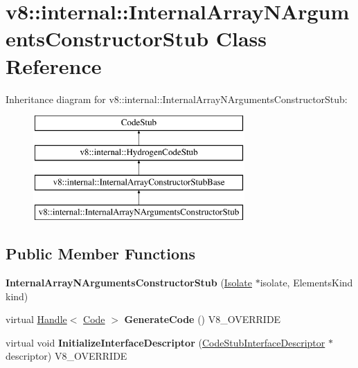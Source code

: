\hypertarget{classv8_1_1internal_1_1_internal_array_n_arguments_constructor_stub}{}\section{v8\+:\+:internal\+:\+:Internal\+Array\+N\+Arguments\+Constructor\+Stub Class Reference}
\label{classv8_1_1internal_1_1_internal_array_n_arguments_constructor_stub}
Inheritance diagram for v8\+:\+:internal\+:\+:Internal\+Array\+N\+Arguments\+Constructor\+Stub\+:\begin{figure}[H]
\begin{center}
\leavevmode
\includegraphics[height=4.000000cm]{classv8_1_1internal_1_1_internal_array_n_arguments_constructor_stub}
\end{center}
\end{figure}
\subsection*{Public Member Functions}
\begin{DoxyCompactItemize}
\item 
\hypertarget{classv8_1_1internal_1_1_internal_array_n_arguments_constructor_stub_af94b73d095ffded5b0cff059e72cbd9a}{}{\bfseries Internal\+Array\+N\+Arguments\+Constructor\+Stub} (\hyperlink{classv8_1_1internal_1_1_isolate}{Isolate} $\ast$isolate, Elements\+Kind kind)\label{classv8_1_1internal_1_1_internal_array_n_arguments_constructor_stub_af94b73d095ffded5b0cff059e72cbd9a}

\item 
\hypertarget{classv8_1_1internal_1_1_internal_array_n_arguments_constructor_stub_ae9d37419002afc731388adb9dbcad96d}{}virtual \hyperlink{classv8_1_1internal_1_1_handle}{Handle}$<$ \hyperlink{classv8_1_1internal_1_1_code}{Code} $>$ {\bfseries Generate\+Code} () V8\+\_\+\+O\+V\+E\+R\+R\+I\+D\+E\label{classv8_1_1internal_1_1_internal_array_n_arguments_constructor_stub_ae9d37419002afc731388adb9dbcad96d}

\item 
\hypertarget{classv8_1_1internal_1_1_internal_array_n_arguments_constructor_stub_a152eeb9b4dbc6d2ff1ab0620fc9ad3b1}{}virtual void {\bfseries Initialize\+Interface\+Descriptor} (\hyperlink{classv8_1_1internal_1_1_code_stub_interface_descriptor}{Code\+Stub\+Interface\+Descriptor} $\ast$descriptor) V8\+\_\+\+O\+V\+E\+R\+R\+I\+D\+E\label{classv8_1_1internal_1_1_internal_array_n_arguments_constructor_stub_a152eeb9b4dbc6d2ff1ab0620fc9ad3b1}

\end{DoxyCompactItemize}
